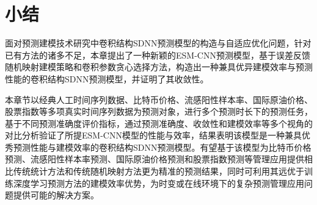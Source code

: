 \section{小结\label{sec:esm.conc}}


面对预测建模技术研究中卷积结构SDNN预测模型的构造与自适应优化问题，针对已有方法的诸多不足，本章提出了一种新颖的ESM-CNN预测模型，基于误差反馈随机映射建模策略和卷积参数贪心选择方法，构造出一种兼具优异建模效率与预测性能的卷积结构SDNN预测模型，并证明了其收敛性。

本章节以经典人工时间序列数据、比特币价格、流感阳性样本率、国际原油价格、股票指数等多项真实时间序列数据为预测对象，进行多个预测时长下的预测任务，基于不同预测准确度评价指标，通过预测准确度、收敛性和建模效率等多个视角的对比分析验证了所提ESM-CNN模型的性能与效率，结果表明该模型是一种兼具优秀预测性能与建模效率的卷积结构SDNN预测模型。有望基于该模型为比特币价格预测、流感阳性样本率预测、国际原油价格预测和股票指数预测等管理应用提供相比传统统计方法和传统随机映射方法更为精准的预测结果，同时可利用其远优于训练深度学习预测方法的建模效率优势，为时变或在线环境下的复杂预测管理应用问题提供可能的解决方案。